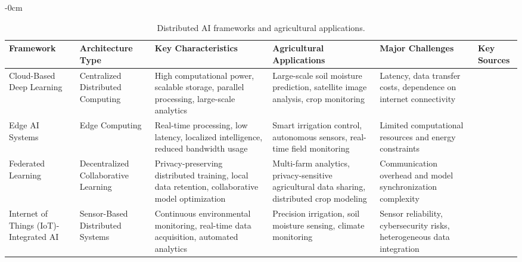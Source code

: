 \documentclass[land,review,accept,pdftex,oneauthor]{Definitions/mdpi}
\begin{document}
\begin{table}[H] 
\caption{Distributed AI frameworks and agricultural applications.\label{tab:distributed_ai}}

\small
\renewcommand{\arraystretch}{1.2}

\begin{adjustwidth}{-\extralength}{0cm}
\begin{minipage}{\fulllength}
\begin{tabularx}{\textwidth}{m{2.2cm}<{\raggedright}m{2.8cm}<{\raggedright}m{3.2cm}<{\raggedright}m{3.2cm}<{\raggedright}m{3.2cm}<{\raggedright}m{1.4cm}<{\raggedright}}
\toprule

Framework &
Architecture Type &
Key Characteristics &
Agricultural Applications &
Major Challenges &
Key Sources \\
\midrule



Cloud-Based Deep Learning &
Centralized Distributed Computing &
High computational power, scalable storage, parallel processing, large-scale analytics &
Large-scale soil moisture prediction, satellite image analysis, crop monitoring &
Latency, data transfer costs, dependence on internet connectivity &
\citep{Kamilaris2018,Liakos2018} \\ 
\midrule

Edge AI Systems &
Edge Computing &
Real-time processing, low latency, localized intelligence, reduced bandwidth usage &
Smart irrigation control, autonomous sensors, real-time field monitoring &
Limited computational resources and energy constraints &
\citep{Tariq,s25175302} \\ 
\midrule

Federated Learning &
Decentralized Collaborative Learning &
Privacy-preserving distributed training, local data retention, collaborative model optimization &
Multi-farm analytics, privacy-sensitive agricultural data sharing, distributed crop modeling &
Communication overhead and model synchronization complexity &
\citep{Yang3298981,Li2020_FL} \\
\midrule

Internet of Things (IoT)-Integrated AI &
Sensor-Based Distributed Systems &
Continuous environmental monitoring, real-time data acquisition, automated analytics &
Precision irrigation, soil moisture sensing, climate monitoring &
Sensor reliability, cybersecurity risks, heterogeneous data integration &
\citep{Paria2025,Khanna2019,Ayaz2019} \\ 
\midrule


\end{tabularx}
\end{minipage}
\end{adjustwidth}
\end{table}
\end{document}
